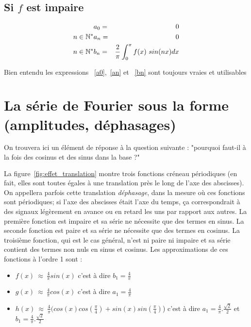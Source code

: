 \subsection{Si \texorpdfstring{$f$}{f} est impaire}
\begin{eqnarray}
& a_0=&0\label{aimpaire0}\\
n\in \mathbb{N}^* & a_n=&0  \label{animpaire}\\
n\in \mathbb{N}^* & b_n=& \frac{2}{\pi}\int_{0}^{\pi}f(x)\ sin(nx) dx \label{bnimpaire}
\end{eqnarray}

Bien entendu les expressions ~\ref{a0},~\ref{an} et ~\ref{bn} sont
toujours vraies et utilisables

\section{La série de Fourier sous la forme (amplitudes, déphasages)}

On trouvera ici un élément de réponse à la question suivante : "pourquoi faut-il à la fois des cosinus et des sinus dans la base ?"

La figure~\ref{fig:effet_translation} montre trois fonctions créneau périodiques (en fait, elles sont toutes égales à une translation près le long de l'axe des abscisses). On appellera parfois cette translation \emph{déphasage}, dans la mesure où ces fonctions sont périodiques; si l'axe des abscisses était l'axe du temps, ça correspondrait à des signaux légèrement en avance ou en retard les uns par rapport aux autres. La première fonction est impaire et sa série ne nécessite que des termes en sinus. La seconde fonction est paire et sa série ne nécessite que des termes en cosinus. La troisième fonction, qui est le cas général, n'est ni paire ni impaire et sa série contient des termes non nuls en sinus et cosinus. Les approximations de ces fonctions à l'ordre 1 sont :

\begin{itemize}
  \item $f(x) ~ \approx ~\frac{4}{\pi}sin(x)$ c'est à dire $b_1=\frac{4}{\pi}$
  \item $g(x) ~ \approx ~ \frac{4}{\pi}cos(x)$ c'est à dire $a_1=\frac{4}{\pi}$
  \item $h(x) ~ \approx ~ \frac{4}{\pi}\Big(cos(x)cos(\frac{\pi}{4})+sin(x)sin(\frac{\pi}{4})$\Big)  c'est à dire $a_1=\frac{4}{\pi}.\frac{\sqrt 2}{2}$ et $b_1=\frac{4}{\pi}.\frac{\sqrt 2 }{2}$
\end{itemize}

